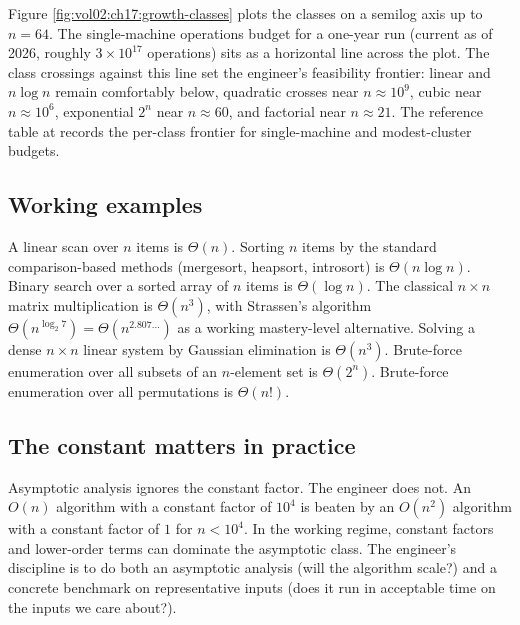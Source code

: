 Figure \ref{fig:vol02:ch17:growth-classes} plots the classes
on a semilog axis up to $n = 64$. The single-machine
operations budget for a one-year run (current as of 2026, roughly
$3 \times 10^{17}$ operations) sits as a horizontal line across the
plot. The class crossings against this line set the engineer's
feasibility frontier: linear and $n \log n$ remain comfortably
below, quadratic crosses near $n \approx 10^{9}$, cubic near
$n \approx 10^{6}$, exponential $2^{n}$ near $n \approx 60$, and
factorial near $n \approx 21$. The reference table at
records the per-class frontier for single-machine and modest-cluster
budgets.



\subsection{Working examples}

A linear scan over $n$ items is $\Theta(n)$. Sorting $n$ items by
the standard comparison-based methods (mergesort, heapsort,
introsort) is $\Theta(n \log n)$. Binary search over a sorted array
of $n$ items is $\Theta(\log n)$. The classical $n \times n$ matrix
multiplication is $\Theta(n^{3})$, with Strassen's algorithm
$\Theta(n^{\log_{2} 7}) = \Theta(n^{2.807\ldots})$ as a working
mastery-level alternative. Solving a dense $n \times n$ linear
system by Gaussian elimination is $\Theta(n^{3})$. Brute-force
enumeration over all subsets of an $n$-element set is $\Theta(2^{n})$.
Brute-force enumeration over all permutations is $\Theta(n!)$.

\subsection{The constant matters in practice}

Asymptotic analysis ignores the constant factor. The engineer does
not. An $O(n)$ algorithm with a constant factor of $10^{4}$ is
beaten by an $O(n^{2})$ algorithm with a constant factor of $1$ for
$n < 10^{4}$. In the working regime, constant factors and lower-order
terms can dominate the asymptotic class. The engineer's discipline
is to do both an asymptotic analysis (will the algorithm scale?)
and a concrete benchmark on representative inputs (does it run in
acceptable time on the inputs we care about?).

